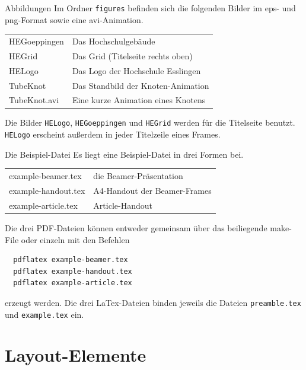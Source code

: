 \begin{frame}{Abbildungen} 
Im Ordner \texttt{figures} befinden sich die folgenden Bilder im eps- und
png-Format sowie eine avi-Animation.

\begin{center}
  \begin{tabular}{lp{6cm}}
  HEGoeppingen & Das Hochschulgebäude \\
  HEGrid & Das Grid (Titelseite rechts oben) \\
  HELogo & Das Logo der Hochschule Esslingen \\
  TubeKnot & Das Standbild der Knoten-Animation \\
  TubeKnot.avi & Eine kurze Animation eines Knotens \\
  \end{tabular}
\end{center}

Die Bilder \texttt{HELogo}, \texttt{HEGoeppingen} und \texttt{HEGrid} werden
für die Titelseite benutzt. \texttt{HELogo} erscheint außerdem in jeder
Titelzeile eines Frames.

\end{frame}

\begin{frame}[fragile]{Die Beispiel-Datei}
Es liegt eine Beispiel-Datei in drei Formen bei. 
\begin{center}
  \begin{tabular}{lp{6cm}}
    example-beamer.tex &  die Beamer-Präsentation \\
    example-handout.tex & A4-Handout der Beamer-Frames \\
    example-article.tex & Article-Handout \\
  \end{tabular}
\end{center}

Die drei PDF-Dateien können entweder gemeinsam über das beiliegende make-File
oder einzeln mit den Befehlen
\begin{verbatim}
  pdflatex example-beamer.tex
  pdflatex example-handout.tex
  pdflatex example-article.tex
\end{verbatim}
erzeugt werden. Die drei LaTex-Dateien binden jeweils die Dateien
\texttt{preamble.tex} und \texttt{example.tex} ein.

\end{frame}

\section{Layout-Elemente}

